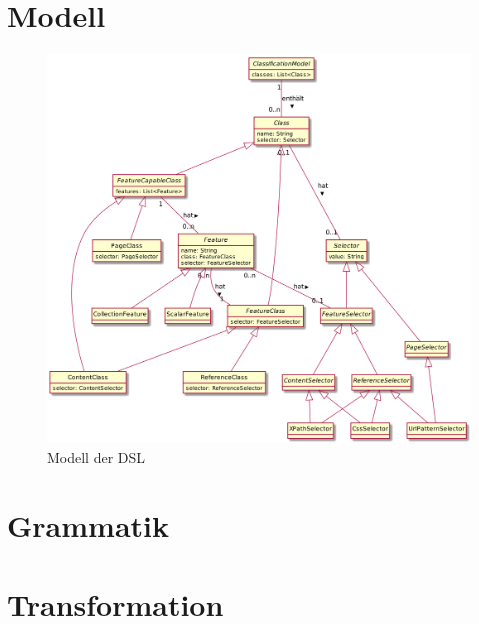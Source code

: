     \section{Modell}
        \begin{figure}[htb]
            \centering
            \includegraphics[width=\textwidth]{../resources/dsl/model.png}
            \caption{Modell der DSL}
            \label{image:dslCompleteModel}
        \end{figure}
    
    \section{Grammatik}
        

    \section{Transformation}
    